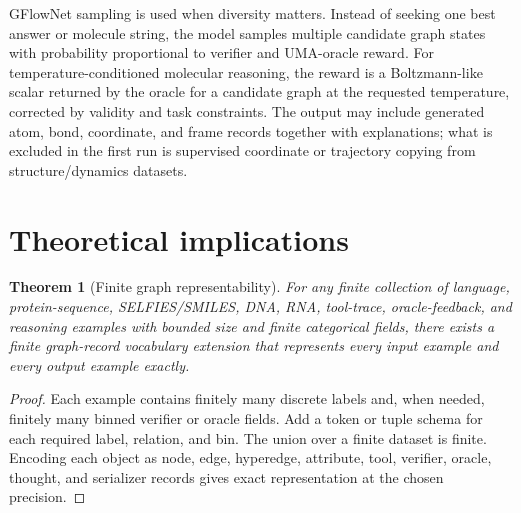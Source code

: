 \documentclass[11pt]{article}
\newtheorem{theorem}[definition]{Theorem}
\newcommand{\1}{\mathbf{1}}
\begin{document}
GFlowNet sampling is used when diversity matters. Instead of seeking one best answer or molecule string, the model samples multiple candidate graph states with probability proportional to verifier and UMA-oracle reward. For temperature-conditioned molecular reasoning, the reward is a Boltzmann-like scalar returned by the oracle for a candidate graph at the requested temperature, corrected by validity and task constraints. The output may include generated atom, bond, coordinate, and frame records together with explanations; what is excluded in the first run is supervised coordinate or trajectory copying from structure/dynamics datasets.


\section{Theoretical implications}

\begin{theorem}[Finite graph representability]
For any finite collection of language, protein-sequence, SELFIES/SMILES, DNA, RNA, tool-trace, oracle-feedback, and reasoning examples with bounded size and finite categorical fields, there exists a finite graph-record vocabulary extension that represents every input example and every output example exactly.
\end{theorem}
\begin{proof}
Each example contains finitely many discrete labels and, when needed, finitely many binned verifier or oracle fields. Add a token or tuple schema for each required label, relation, and bin. The union over a finite dataset is finite. Encoding each object as node, edge, hyperedge, attribute, tool, verifier, oracle, thought, and serializer records gives exact representation at the chosen precision.
\end{proof}
\end{document}
